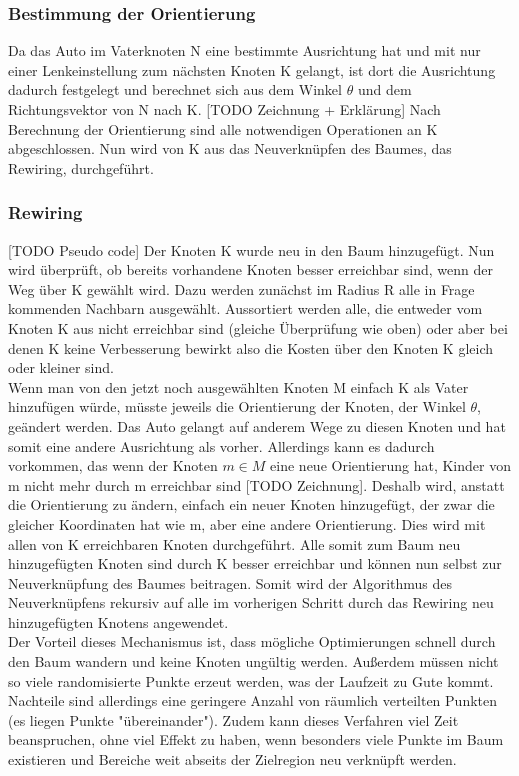 \subsubsection{Bestimmung der Orientierung}
Da das Auto im Vaterknoten N eine bestimmte Ausrichtung hat und mit nur einer Lenkeinstellung zum nächsten Knoten K gelangt, ist dort die Ausrichtung dadurch festgelegt und berechnet sich aus dem Winkel $\theta$ und dem Richtungsvektor von N nach K. [TODO Zeichnung + Erklärung]
Nach Berechnung der Orientierung sind alle notwendigen Operationen an K abgeschlossen. Nun wird von K aus das Neuverknüpfen des Baumes, das Rewiring, durchgeführt.

\subsubsection{Rewiring}
[TODO Pseudo code] Der Knoten K wurde neu in den Baum hinzugefügt. Nun wird überprüft, ob bereits vorhandene Knoten besser erreichbar sind, wenn der Weg über K gewählt wird.
Dazu werden zunächst im Radius R alle in Frage kommenden Nachbarn ausgewählt. Aussortiert werden alle, die entweder vom Knoten K aus nicht erreichbar sind (gleiche Überprüfung wie oben) oder aber bei denen K keine Verbesserung bewirkt also die Kosten über den Knoten K gleich oder kleiner sind. \\
Wenn man von den jetzt noch ausgewählten Knoten M einfach K als Vater hinzufügen würde, müsste jeweils die Orientierung der Knoten, der Winkel $\theta$, geändert werden. Das Auto gelangt auf anderem Wege zu diesen Knoten und hat somit eine andere Ausrichtung als vorher. Allerdings kann es dadurch vorkommen, das wenn der Knoten $m \in M$ eine neue Orientierung hat, Kinder von m nicht mehr durch m erreichbar sind [TODO Zeichnung]. Deshalb wird, anstatt die Orientierung zu ändern, einfach ein neuer Knoten hinzugefügt, der zwar die gleicher Koordinaten hat wie m, aber eine andere Orientierung. Dies wird mit allen von K erreichbaren Knoten durchgeführt. Alle somit zum Baum neu hinzugefügten Knoten sind durch K besser erreichbar und können nun selbst zur Neuverknüpfung des Baumes beitragen. Somit wird der Algorithmus des Neuverknüpfens rekursiv auf alle im vorherigen Schritt durch das Rewiring neu hinzugefügten Knotens angewendet. \\
Der Vorteil dieses Mechanismus ist, dass mögliche Optimierungen schnell durch den Baum wandern und keine Knoten ungültig werden. Außerdem müssen nicht so viele randomisierte Punkte erzeut werden, was der Laufzeit zu Gute kommt. Nachteile sind allerdings eine geringere Anzahl von räumlich verteilten Punkten (es liegen Punkte "übereinander"). Zudem kann dieses Verfahren viel Zeit beanspruchen, ohne viel Effekt zu haben, wenn besonders viele Punkte im Baum existieren und Bereiche weit abseits der Zielregion neu verknüpft werden.

